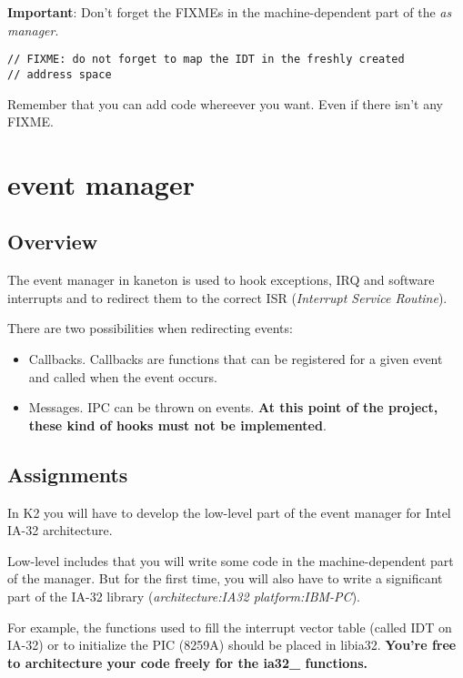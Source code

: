 \textbf{Important}: Don't forget the FIXMEs in the machine-dependent
part of the \textit{as manager}.

\begin{verbatim}
// FIXME: do not forget to map the IDT in the freshly created
// address space
\end{verbatim}

Remember that you can add code whereever you want. Even if there isn't any FIXME.

%
%

\newpage

\section{event manager}

\subsection* {Overview}

The event manager in kaneton is used to hook exceptions, IRQ and
software interrupts and to redirect them to the correct ISR
(\emph{Interrupt Service Routine}).

There are two possibilities when redirecting events:
\begin{itemize}
\item
  Callbacks. Callbacks are functions that can be registered for
  a given event and called when the event occurs.
\item
  Messages. IPC can be thrown on events. \textbf{At this point
    of the project, these kind of hooks must not be implemented}.
\end{itemize}

\subsection* {Assignments}

In K2 you will have to develop the low-level part of the event
manager for Intel IA-32 architecture.

Low-level includes that you will write some code in the
machine-dependent part of the manager. But for the first time, you
will also have to write a significant part of the IA-32 library
(\emph{architecture:IA32 platform:IBM-PC}).

For example, the functions used to fill the interrupt vector table
(called IDT on IA-32) or to initialize the PIC (8259A) should be placed
in libia32. \textbf{You're free to architecture your code freely for
the ia32\_ functions.}

